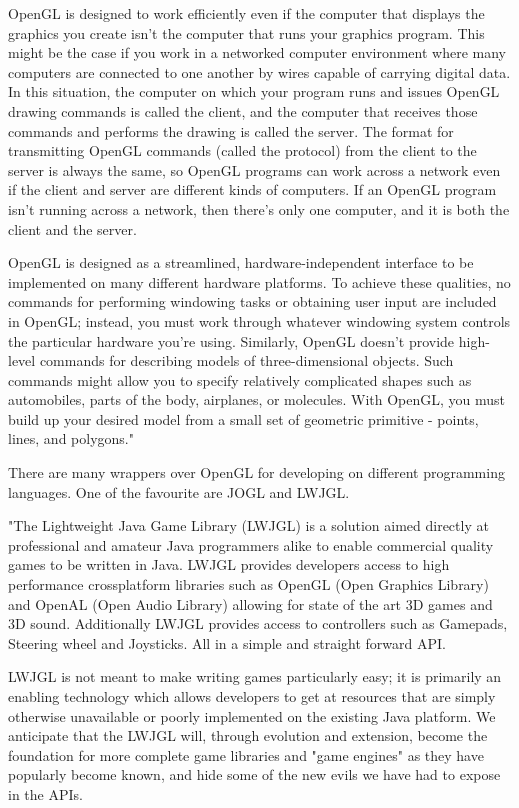 \documentclass[a4paper,oneside]{article}
\begin{document}
OpenGL is designed to work efficiently even if the computer that displays the graphics you create isn't the computer that runs your graphics program. This might be the case if you work in a networked computer environment where many computers are connected to one another by wires capable of carrying digital data. In this situation, the computer on which your program runs and issues OpenGL drawing commands is called the client, and the computer that receives those commands and performs the drawing is called the server. The format for transmitting OpenGL commands (called the protocol) from the client to the server is always the same, so OpenGL programs can work across a network even if the client and server are different kinds of computers. If an OpenGL program isn't running across a network, then there's only one computer, and it is both the client and the server.


OpenGL is designed as a streamlined, hardware-independent interface to be implemented on many different hardware platforms. To achieve these qualities, no commands for performing windowing tasks or obtaining user input are included in OpenGL; instead, you must work through whatever windowing system controls the particular hardware you're using. Similarly, OpenGL doesn't provide high-level commands for describing models of three-dimensional objects. Such commands might allow you to specify relatively complicated shapes such as automobiles, parts of the body, airplanes, or molecules. With OpenGL, you must build up your desired model from a small set of geometric primitive - points, lines, and polygons."~\cite{THE_RED_BOOK}


There are many wrappers over OpenGL for developing on different programming languages. One of the favourite are JOGL and LWJGL.


"The Lightweight Java Game Library (LWJGL) is a solution aimed directly at professional and amateur Java programmers alike to enable commercial quality games to be written in Java. LWJGL provides developers access to high performance crossplatform libraries such as OpenGL (Open Graphics Library) and OpenAL (Open Audio Library) allowing for state of the art 3D games and 3D sound. Additionally LWJGL provides access to controllers such as Gamepads, Steering wheel and Joysticks. All in a simple and straight forward API.


LWJGL is not meant to make writing games particularly easy; it is primarily an enabling technology which allows developers to get at resources that are simply otherwise unavailable or poorly implemented on the existing Java platform. We anticipate that the LWJGL will, through evolution and extension, become the foundation for more complete game libraries and "game engines" as they have popularly become known, and hide some of the new evils we have had to expose in the APIs.
\end{document}
